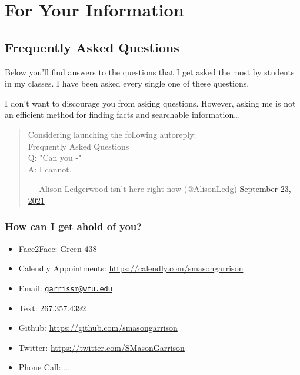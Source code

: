 \hypertarget{part-for-your-information}{%
\part*{For Your Information}\label{part-for-your-information}}


\hypertarget{frequently-asked-questions}{%
\chapter{Frequently Asked Questions}\label{frequently-asked-questions}}

Below you'll find answers to the questions that I get asked the most by students in my classes. I have been asked every single one of these questions.

I don't want to discourage you from asking questions. However, asking me is not an efficient method for finding facts and searchable information\ldots{}

\begin{quote}
Considering launching the following autoreply:\\
Frequently Asked Questions\\
Q: "Can you -"\\
A: I cannot.

\begin{flushright}--- Alison Ledgerwood isn't here right now (@AlisonLedg) \href{https://twitter.com/AlisonLedg/status/1441181845706579969}{September
23,
2021}\end{flushright}
\end{quote}

\hypertarget{how-can-i-get-ahold-of-you}{%
\section{How can I get ahold of you?}\label{how-can-i-get-ahold-of-you}}

\begin{itemize}
\item
  Face2Face: Green 438
\item
  Calendly Appointments: \url{https://calendly.com/smasongarrison}
\item
  Email: \href{mailto:garrissm@wfu.edu}{\nolinkurl{garrissm@wfu.edu}}
\item
  Text: 267.357.4392
\item
  Github: \url{https://github.com/smasongarrison}
\item
  Twitter: \url{https://twitter.com/SMasonGarrison}
\item
  Phone Call: \ldots{}
\end{itemize}

